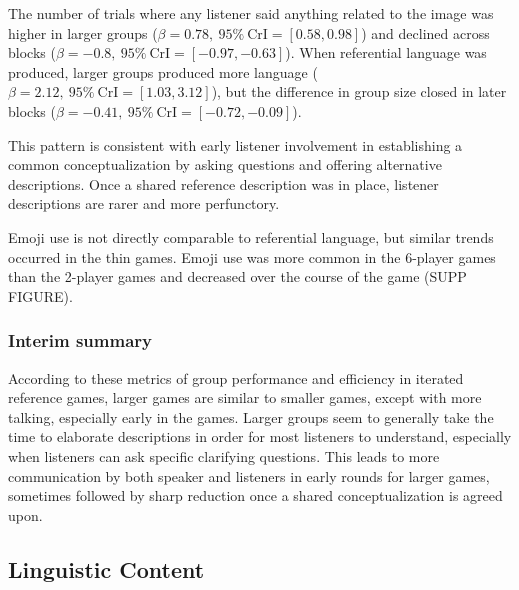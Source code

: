 \documentclass[
  english,
  a4paper,
]{article}
\begin{document}
The number of trials where any listener said anything related to the image was higher in larger groups (\(\beta=0.78,\:95\%\:\mathrm{CrI}=[0.58, 0.98]\)) and declined across blocks (\(\beta=-0.8,\:95\%\:\mathrm{CrI}=[-0.97, -0.63]\)). When referential language was produced, larger groups produced more language (\(\beta=2.12,\:95\%\:\mathrm{CrI}=[1.03, 3.12]\)), but the difference in group size closed in later blocks (\(\beta=-0.41,\:95\%\:\mathrm{CrI}=[-0.72, -0.09]\)).

This pattern is consistent with early listener involvement in establishing a common conceptualization by asking questions and offering alternative descriptions. Once a shared reference description was in place, listener descriptions are rarer and more perfunctory.

Emoji use is not directly comparable to referential language, but similar trends occurred in the thin games. Emoji use was more common in the 6-player games than the 2-player games and decreased over the course of the game (SUPP FIGURE).

\hypertarget{interim-summary}{%
\subsubsection{Interim summary}\label{interim-summary}}

According to these metrics of group performance and efficiency in iterated reference games, larger games are similar to smaller games, except with more talking, especially early in the games. Larger groups seem to generally take the time to elaborate descriptions in order for most listeners to understand, especially when listeners can ask specific clarifying questions. This leads to more communication by both speaker and listeners in early rounds for larger games, sometimes followed by sharp reduction once a shared conceptualization is agreed upon.

\hypertarget{linguistic-content}{%
\subsection{Linguistic Content}\label{linguistic-content}}
\end{document}
